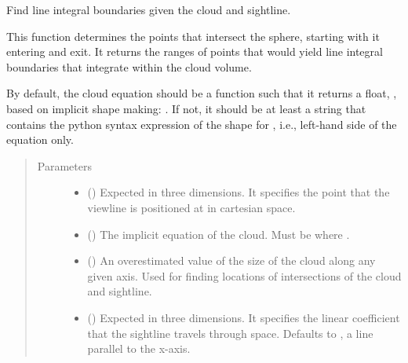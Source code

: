 \documentclass[letterpaper,10pt,english]{sphinxmanual}
\begin{document}
\begin{fulllineitems}
\label{\detokenize{Backend.cloud_line_integration:Backend.cloud_line_integration.line_integral_boundaries}}
Find line integral boundaries given the cloud and sightline.

This function determines the points that intersect the sphere, starting
with it entering and exit. It returns the ranges of points that would
yield line integral boundaries that integrate within the cloud volume.

By default, the cloud equation should be a function such that it returns a
float, , based on implicit shape making: . If
not, it should be at least a string that contains the python syntax
expression of the shape for , i.e., left-hand side of the
equation only.
\begin{quote}\begin{description}
\item[{Parameters}] \leavevmode\begin{itemize}
\item {} 
 () \textendash{} Expected in three dimensions. It specifies the point that the viewline
is positioned at in cartesian space.

\item {} 
 () \textendash{} The implicit equation of the cloud. Must be  where
.

\item {} 
 () \textendash{} An overestimated value of the size of the cloud along any given axis.
Used for finding locations of intersections of the cloud and sightline.

\item {} 
 () \textendash{} Expected in three dimensions. It specifies the linear coefficient that
the sightline travels through space. Defaults to , a line
parallel to the x-axis.


\end{itemize}
\end{description}
\end{quote}
\end{fulllineitems}
\end{document}

